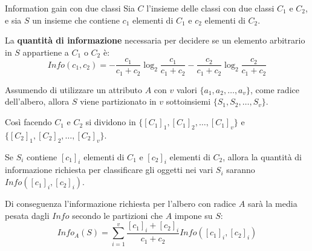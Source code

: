 \begin{esempio}{Information gain con due classi}
Sia $C$ l'insieme delle classi con due classi $C_1$ e $C_2$, e sia
$S$ un insieme che contiene $c_1$ elementi di $C_1$ e $c_2$ elementi di $C_2$.

La \textbf{quantità di informazione} necessaria per decidere se un elemento
arbitrario in $S$ appartiene a $C_1$ o $C_2$ è:
\[
Info(c_1, c_2) = -\frac{c_1}{c_1 + c_2}\log_{2}\frac{c_1}{c_1 + c_2}
- \frac{c_2}{c_1 + c_2}\log_{2}\frac{c_2}{c_1 + c_2}
\]

Assumendo di utilizzare un attributo $A$ con $v$ valori $\{a_1, a_2, \ldots, a_v\}$,
come radice dell'albero, allora $S$ viene partizionato in $v$ sottoinsiemi
$\{S_1, S_2, \ldots, S_v\}$.

Così facendo $C_1$ e $C_2$ si dividono in $\{[C_1]_1, [C_1]_2, \ldots, [C_1]_v\}$ e
$\{[C_2]_1, [C_2]_2, \ldots, [C_2]_v\}$.

Se $S_i$ contiene $[c_{1}]_i$ elementi di $C_1$ e $[c_2]_i$ elementi di $C_2$,
allora la quantità di informazione richiesta per classificare gli oggetti nei
vari $S_i$ saranno $Info([c_{1}]_i, [c_{2}]_i)$.

Di conseguenza l'informazione richiesta per l'albero con radice $A$ sarà la
media pesata dagli $Info$ secondo le partizioni che $A$ impone su $S$:
\[
Info_{A}(S) = \sum_{i=1}^{v}\frac{[c_1]_i + [c_2]_i}{c_1 + c_2} Info([c_{1}]_i, [c_{2}]_i)
\]

\end{esempio}

